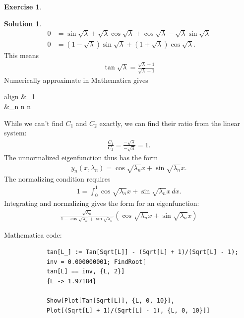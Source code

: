\documentclass{article}
\theoremstyle{definition}
\newtheorem*{exer*}{Exercise}
\newtheorem*{sln*}{Solution}
\begin{document}
\begin{exer*}
\begin{enumerate}
\begin{sln*}
\begin{align*}
			0 &=  \sin\sqrt{\lambda} + \sqrt{\lambda}\cos\sqrt{\lambda} + \cos\sqrt{\lambda} - \sqrt{\lambda}\sin\sqrt{\lambda}\\
			0 &= (1-\sqrt{\lambda})\sin\sqrt{\lambda} + (1+\sqrt{\lambda})\cos\sqrt{\lambda}.
			\end{align*}
			This means
			\begin{align*}
			\boxed{\tan\sqrt{\lambda} = \frac{\sqrt{\lambda} + 1}{\sqrt{\lambda} - 1}}
			\end{align*}
			Numerically approximate in Mathematica gives
			\begin{empheq}[box=\fbox]{align} 
			&\lambda_1 \nonumber\\
			&\lambda_n \approx n \hspace{0.5cm} n \nonumber 
			\end{empheq}
			While we can't find $C_1$ and $C_2$ exactly, we can find their ratio from the linear system:
			\begin{align*}
			\frac{C_1}{C_2} = \frac{-\sqrt{\lambda}}{-\sqrt{\lambda}} = 1.
			\end{align*}
			The unnormalized eigenfunction thus has the form
			\begin{align*}
			y_n(x,\lambda_n) = \cos\sqrt{\lambda_n} x + \sin\sqrt{\lambda_n} x.
			\end{align*}
			The normalizing condition requires
			\begin{align*}
			1 = \int^1_0 \cos\sqrt{\lambda_n} x + \sin\sqrt{\lambda_n}  x\,dx.
			\end{align*}
			Integrating and normalizing gives the form for an eigenfunction:
			\begin{align*}
			\boxed{ \frac{\sqrt{\lambda_n}}{1 - \cos\sqrt{\lambda_n} + \sin\sqrt{\lambda_n}}\left( \cos\sqrt{\lambda_n} x + \sin\sqrt{\lambda_n} x \right) }
			\end{align*}
			
			Mathematica code:
			\begin{lstlisting}
			tan[L_] := Tan[Sqrt[L]] - (Sqrt[L] + 1)/(Sqrt[L] - 1); 
			inv = 0.000000001; FindRoot[
			tan[L] == inv, {L, 2}]
			{L -> 1.97184}
			
			Show[Plot[Tan[Sqrt[L]], {L, 0, 10}], 
			Plot[(Sqrt[L] + 1)/(Sqrt[L] - 1), {L, 0, 10}]]
			

\end{lstlisting}
\end{sln*}
\end{enumerate}
\end{exer*}
\end{document}
